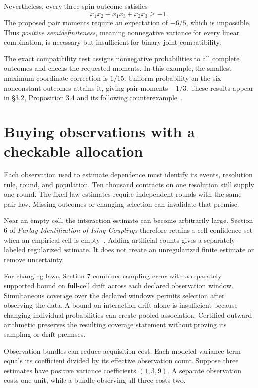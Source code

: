 \documentclass{momentum}
\begin{document}
Nevertheless, every three-spin outcome satisfies
\[
x_1x_2+x_1x_3+x_2x_3\geq-1.
\]
The proposed pair moments require an expectation of $-6/5$, which is impossible. Thus \emph{positive semidefiniteness}, meaning nonnegative variance for every linear combination, is necessary but insufficient for binary joint compatibility.

The exact compatibility test assigns nonnegative probabilities to all complete outcomes and checks the requested moments. In this example, the smallest maximum-coordinate correction is $1/15$. Uniform probability on the six nonconstant outcomes attains it, giving pair moments $-1/3$. These results appear in \S3.2, Proposition 3.4 and its following counterexample~\cite{parlay}.

\section{Buying observations with a checkable allocation}

Each observation used to estimate dependence must identify its events, resolution rule, round, and population. Ten thousand contracts on one resolution still supply one round. The fixed-law estimates require independent rounds with the same pair law. Missing outcomes or changing selection can invalidate that premise.

Near an empty cell, the interaction estimate can become arbitrarily large. Section 6 of \emph{Parlay Identification of Ising Couplings} therefore retains a cell confidence set when an empirical cell is empty~\cite{parlay}. Adding artificial counts gives a separately labeled regularized estimate. It does not create an unregularized finite estimate or remove uncertainty.

For changing laws, Section 7 combines sampling error with a separately supported bound on full-cell drift across each declared observation window. Simultaneous coverage over the declared windows permits selection after observing the data. A bound on interaction drift alone is insufficient because changing individual probabilities can create pooled association. Certified outward arithmetic preserves the resulting coverage statement without proving its sampling or drift premises.

Observation bundles can reduce acquisition cost. Each modeled variance term equals its coefficient divided by its effective observation count. Suppose three estimates have positive variance coefficients $(1,3,9)$. A separate observation costs one unit, while a bundle observing all three costs two.
\end{document}
